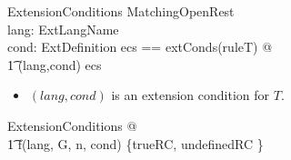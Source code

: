 \documentclass{article}
\begin{document}
\begin{schema}{ExtensionConditions}
	MatchingOpenRest \\
	lang: ExtLangName \\
	cond: ExtDefinition
\where
	\LET ecs == extConds(ruleT) @ \\
\t1		(lang,cond) \in \ran ecs
\end{schema}
\begin{itemize}
\item $(lang, cond)$ is an extension condition for $T$.
\end{itemize}

\begin{zed}
	\forall ExtensionConditions @ \\
\t1		f(lang, G, n, cond) \in \{trueRC, undefinedRC \}
\end{zed}


\end{document}
